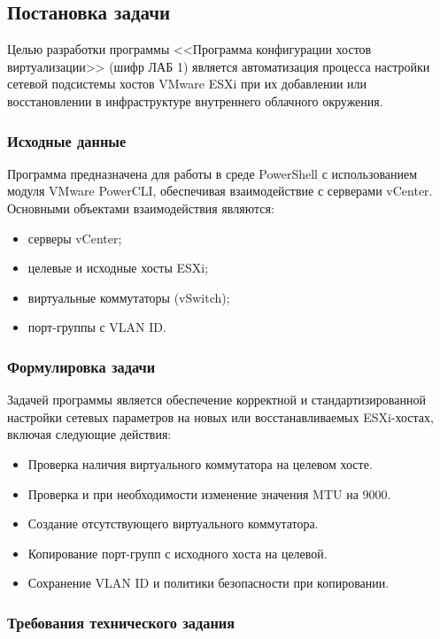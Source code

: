 \subsection{Постановка задачи}

Целью разработки программы <<Программа конфигурации хостов виртуализации>> (шифр ЛАБ 1) является автоматизация процесса настройки сетевой подсистемы хостов VMware ESXi при их добавлении или восстановлении в инфраструктуре внутреннего облачного окружения.

\subsubsection{Исходные данные}
Программа предназначена для работы в среде PowerShell с использованием модуля VMware PowerCLI, обеспечивая взаимодействие с серверами vCenter. Основными объектами взаимодействия являются:

\begin{itemize}
    \item серверы vCenter;
    \item целевые и исходные хосты ESXi;
    \item виртуальные коммутаторы (vSwitch);
    \item порт-группы с VLAN ID.
\end{itemize}

\subsubsection{Формулировка задачи}
Задачей программы является обеспечение корректной и стандартизированной настройки сетевых параметров на новых или восстанавливаемых ESXi-хостах, включая следующие действия:

\begin{itemize}
    \item Проверка наличия виртуального коммутатора на целевом хосте.
    \item Проверка и при необходимости изменение значения MTU на 9000.
    \item Создание отсутствующего виртуального коммутатора.
    \item Копирование порт-групп с исходного хоста на целевой.
    \item Сохранение VLAN ID и политики безопасности при копировании.
\end{itemize}

\subsubsection{Требования технического задания}


